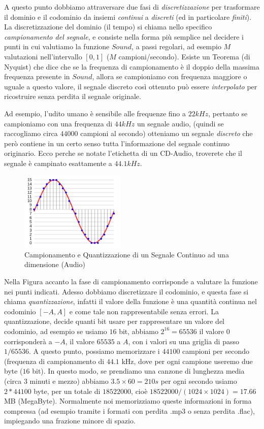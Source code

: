 A questo punto dobbiamo attraversare due fasi di \emph{discretizzazione} per trasformare il dominio e il codominio da insiemi \emph{continui} a \emph{discreti} (ed in particolare \emph{finiti}). La discretizzazione del dominio (il tempo) si chiama nello specifico \emph{campionamento del segnale}, e consiste nella forma più semplice nel 
decidere i punti in cui valutiamo la funzione $Sound$, a passi regolari, ad esempio $M$ valutazioni nell'intervallo $[0,1]$ ($M$ campioni/secondo). 
Esiste un Teorema (di Nyquist) che dice che se la frequenza di campionamento è il doppio della massima frequenza presente in $Sound$, allora se campioniamo con frequenza maggiore o uguale a questo valore, il segnale discreto così ottenuto può essere \emph{interpolato} per ricostruire senza perdita il segnale originale.

Ad esempio, l'udito umano è sensibile alle frequenze fino a $22kHz$, pertanto se campioniamo con una frequenza di $44kHz$ un segnale audio, (quindi se raccogliamo circa $44000$ campioni al secondo) otteniamo un segnale \emph{discreto} che però contiene in un certo senso tutta l'informazione del segnale continuo originario. Ecco perche se notate l'etichetta di un CD-Audio, troverete che il segnale è campinato esattamente a $44.1 kHz$.

\begin{figure}
\includegraphics[width=5cm]{Pcm.png}
\caption{\footnotesize Campionamento e Quantizzazione di un Segnale Continuo ad una dimensione (Audio)}
\end{figure}

Nella Figura accanto la fase di campionamento corrisponde a valutare la
funzione nei punti indicati. Adesso dobbiamo discretizzare il codominio, e
questa fase si chiama \emph{quantizzazione}, infatti il valore della funzione è
una quantità continua nel codominio $[-A,A]$ e come tale non rappresentabile
senza errori. La quantizzazione, decide quanti bit usare per rappresentare un
valore del codominio, ad esempio se usiamo $16$ bit, abbiamo $2^{16} = 65536$
il valore $0$ corrisponderà a $-A$, il valore $65535$ a $A$, con i valori su
una griglia di passo $1/65536$. A questo punto, possiamo memorizzare i $44100$
campioni per secondo (frequenza di campionamento di $44.1$ kHz, dove per ogni
campione useremo due byte ($16$ bit). In questo modo, se prendiamo una canzone
di lunghezza media (circa $3$ minuti e mezzo) abbiamo $3.5\times60 = 210s$ per
ogni secondo usiamo $2*44100$ byte, per un totale di $18522000$, cioè $
18522000 / (1024\times 1024) = 17.66$ MB (MegaByte). Normalmente noi
memorizziamo queste informazioni in forma compressa (ad esempio tramite i
formati con perdita \textsf{.mp3} o senza perdita \textsf{.flac}), impiegando
una frazione minore di spazio.

